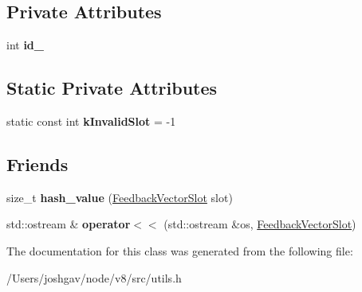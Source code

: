 \subsection*{Private Attributes}
\begin{DoxyCompactItemize}
\item 
int {\bfseries id\+\_\+}\hypertarget{classv8_1_1internal_1_1_feedback_vector_slot_a9ebc537ba490fe9e88bc6e178bd416e6}{}\label{classv8_1_1internal_1_1_feedback_vector_slot_a9ebc537ba490fe9e88bc6e178bd416e6}

\end{DoxyCompactItemize}
\subsection*{Static Private Attributes}
\begin{DoxyCompactItemize}
\item 
static const int {\bfseries k\+Invalid\+Slot} = -\/1\hypertarget{classv8_1_1internal_1_1_feedback_vector_slot_a16948d90d536d68a103a8042c21a1fd8}{}\label{classv8_1_1internal_1_1_feedback_vector_slot_a16948d90d536d68a103a8042c21a1fd8}

\end{DoxyCompactItemize}
\subsection*{Friends}
\begin{DoxyCompactItemize}
\item 
size\+\_\+t {\bfseries hash\+\_\+value} (\hyperlink{classv8_1_1internal_1_1_feedback_vector_slot}{Feedback\+Vector\+Slot} slot)\hypertarget{classv8_1_1internal_1_1_feedback_vector_slot_a9880c9ea8f632fb3c792f4311a834e4b}{}\label{classv8_1_1internal_1_1_feedback_vector_slot_a9880c9ea8f632fb3c792f4311a834e4b}

\item 
std\+::ostream \& {\bfseries operator$<$$<$} (std\+::ostream \&os, \hyperlink{classv8_1_1internal_1_1_feedback_vector_slot}{Feedback\+Vector\+Slot})\hypertarget{classv8_1_1internal_1_1_feedback_vector_slot_ad28270e2cf8b01cd79f8f50022da2257}{}\label{classv8_1_1internal_1_1_feedback_vector_slot_ad28270e2cf8b01cd79f8f50022da2257}

\end{DoxyCompactItemize}


The documentation for this class was generated from the following file\+:\begin{DoxyCompactItemize}
\item 
/\+Users/joshgav/node/v8/src/utils.\+h\end{DoxyCompactItemize}
